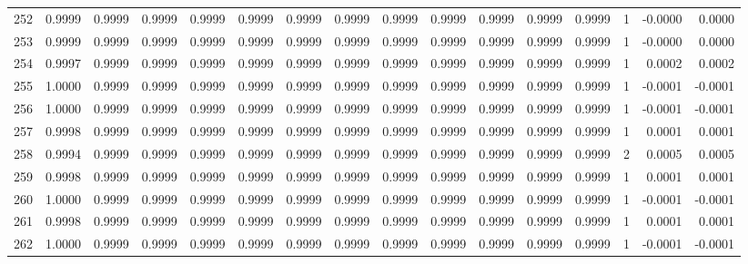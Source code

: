 \begin{tabular}{lrrrrrrrrrrrrrrr}
252 &      0.9999 &  0.9999 &  0.9999 &  0.9999 &  0.9999 &  0.9999 &  0.9999 &  0.9999 &  0.9999 &  0.9999 &   0.9999 &     0.9999 &      1 &                   -0.0000 &                     0.0000 \\
253 &      0.9999 &  0.9999 &  0.9999 &  0.9999 &  0.9999 &  0.9999 &  0.9999 &  0.9999 &  0.9999 &  0.9999 &   0.9999 &     0.9999 &      1 &                   -0.0000 &                     0.0000 \\
254 &      0.9997 &  0.9999 &  0.9999 &  0.9999 &  0.9999 &  0.9999 &  0.9999 &  0.9999 &  0.9999 &  0.9999 &   0.9999 &     0.9999 &      1 &                    0.0002 &                     0.0002 \\
255 &      1.0000 &  0.9999 &  0.9999 &  0.9999 &  0.9999 &  0.9999 &  0.9999 &  0.9999 &  0.9999 &  0.9999 &   0.9999 &     0.9999 &      1 &                   -0.0001 &                    -0.0001 \\
256 &      1.0000 &  0.9999 &  0.9999 &  0.9999 &  0.9999 &  0.9999 &  0.9999 &  0.9999 &  0.9999 &  0.9999 &   0.9999 &     0.9999 &      1 &                   -0.0001 &                    -0.0001 \\
257 &      0.9998 &  0.9999 &  0.9999 &  0.9999 &  0.9999 &  0.9999 &  0.9999 &  0.9999 &  0.9999 &  0.9999 &   0.9999 &     0.9999 &      1 &                    0.0001 &                     0.0001 \\
258 &      0.9994 &  0.9999 &  0.9999 &  0.9999 &  0.9999 &  0.9999 &  0.9999 &  0.9999 &  0.9999 &  0.9999 &   0.9999 &     0.9999 &      2 &                    0.0005 &                     0.0005 \\
259 &      0.9998 &  0.9999 &  0.9999 &  0.9999 &  0.9999 &  0.9999 &  0.9999 &  0.9999 &  0.9999 &  0.9999 &   0.9999 &     0.9999 &      1 &                    0.0001 &                     0.0001 \\
260 &      1.0000 &  0.9999 &  0.9999 &  0.9999 &  0.9999 &  0.9999 &  0.9999 &  0.9999 &  0.9999 &  0.9999 &   0.9999 &     0.9999 &      1 &                   -0.0001 &                    -0.0001 \\
261 &      0.9998 &  0.9999 &  0.9999 &  0.9999 &  0.9999 &  0.9999 &  0.9999 &  0.9999 &  0.9999 &  0.9999 &   0.9999 &     0.9999 &      1 &                    0.0001 &                     0.0001 \\
262 &      1.0000 &  0.9999 &  0.9999 &  0.9999 &  0.9999 &  0.9999 &  0.9999 &  0.9999 &  0.9999 &  0.9999 &   0.9999 &     0.9999 &      1 &                   -0.0001 &                    -0.0001 \\

\end{tabular}
